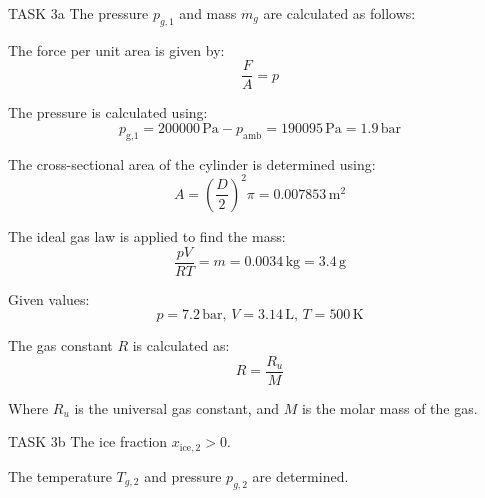 TASK 3a  
The pressure \( p_{g,1} \) and mass \( m_g \) are calculated as follows:  

The force per unit area is given by:  
\[
\frac{F}{A} = p
\]  

The pressure is calculated using:  
\[
p_{\text{g,1}} = 200000 \, \text{Pa} - p_{\text{amb}} = 190095 \, \text{Pa} = 1.9 \, \text{bar}
\]  

The cross-sectional area of the cylinder is determined using:  
\[
A = \left(\frac{D}{2}\right)^2 \pi = 0.007853 \, \text{m}^2
\]  

The ideal gas law is applied to find the mass:  
\[
\frac{pV}{RT} = m = 0.0034 \, \text{kg} = 3.4 \, \text{g}
\]  

Given values:  
\[
p = 7.2 \, \text{bar}, \, V = 3.14 \, \text{L}, \, T = 500 \, \text{K}
\]  

The gas constant \( R \) is calculated as:  
\[
R = \frac{R_u}{M}
\]  

Where \( R_u \) is the universal gas constant, and \( M \) is the molar mass of the gas.  

TASK 3b  
The ice fraction \( x_{\text{ice},2} > 0 \).  

The temperature \( T_{g,2} \) and pressure \( p_{g,2} \) are determined.